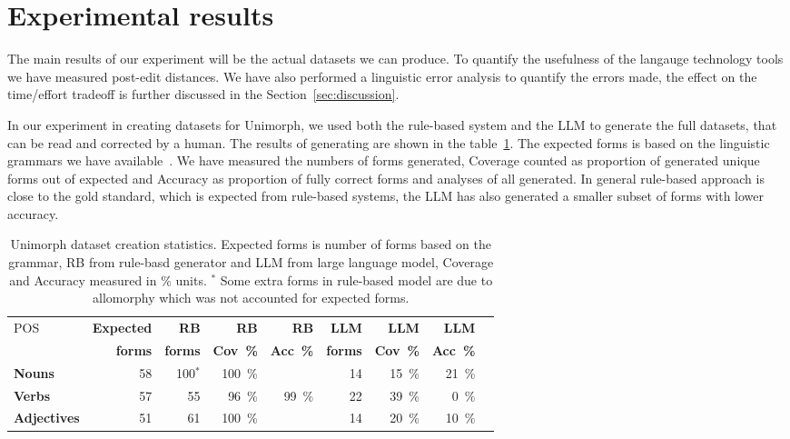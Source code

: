 \documentclass[free]{flammie}
\begin{document}
\section{Experimental results}

The main results of our experiment will be the actual datasets we can produce.
To quantify the usefulness of the langauge technology tools we have measured
post-edit distances.  We have also performed a linguistic error analysis to
quantify the errors made, the effect on the time/effort tradeoff is further
discussed in the Section~\ref{sec:discussion}.

In our experiment in creating datasets for Unimorph, we used both the rule-based
system and the LLM to generate the full datasets, that can be read and corrected
by a human.  The results of generating are shown in the
table~\ref{table:unimorphs}.  The expected forms is based on the linguistic
grammars we have available~\cite{morottaja2023inarinsaamen}.  We have measured
the numbers of forms generated, Coverage counted as proportion of generated
unique forms out of expected and Accuracy as proportion of fully correct forms
and analyses of all generated.  In general rule-based approach is close to the
gold standard, which is expected from rule-based systems, the LLM has also
generated a smaller subset of forms with lower accuracy.

\begin{table}[]
    \centering
    \begin{tabular}{lrrrrrrrr}
    \toprule
        POS & \bf Expected & \bf RB & \bf RB & \bf RB & \bf LLM & \bf LLM &  \bf LLM \\
            & \bf forms & \bf forms & \bf Cov~\% & \bf Acc~\% & \bf forms & \bf Cov~\% & \bf Acc~\% \\
    \midrule
     \bf Nouns   & 58 & 100$^*$ & 100~\% &       & 14 & 15~\% & 21~\%\\
     \bf Verbs   & 57 & 55      & 96~\%  & 99~\% & 22 & 39~\% & 0~\% \\
     \bf Adjectives & 51 & 61 & 100~\%   &       & 14 & 20~\% & 10~\% \\
    \bottomrule
    \end{tabular}
    \caption{Unimorph dataset creation statistics. Expected forms is number of
    forms based  on the grammar, RB from rule-basd generator and LLM from large
    language model, Coverage and Accuracy measured in \% units. $^*$ Some extra
    forms in rule-based model are due to allomorphy which was not accounted for
    expected forms.\label{table:unimorphs}}
\end{table}
\end{document}
